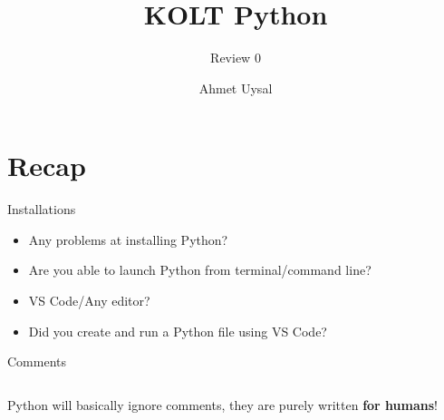 
\usepackage{../KU-Beamer-Template/style/koc} 
\usepackage{minted}
\usepackage{upquote}
 
\title{KOLT Python} 
\subtitle{Review 0} 
\date{}
\author{Ahmet Uysal}




  \maketitle


  \section{Recap}
  
    \begin{frame}{Installations}
      \LARGE
      \begin{itemize}
        \item Any problems at installing Python?
        \pause
        \item Are you able to launch Python from terminal/command line?
        \pause
        \item VS Code/Any editor?
        \pause
        \item Did you create and run a Python file using VS Code?
      \end{itemize}
    \end{frame}

    \begin{frame}{Comments}
			\LARGE
			\inputminted[frame=single,framesep=2pt]{python3}{../Lecture1/code-examples/comments.py}
			Python will basically ignore comments, they are purely written \textbf{for humans}!
    \end{frame}
    

